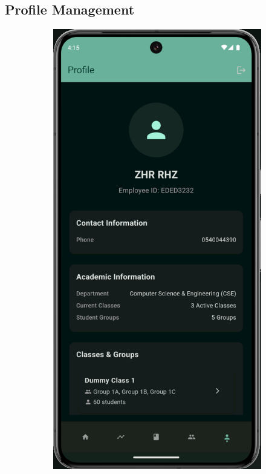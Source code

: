 \subsection{Profile Management}\nopagebreak[4]
\begin{figure}[H]
    \centering
    \begin{subfigure}[b]{0.35\textwidth}
        \includegraphics[width=\textwidth]{images/rachid/teacher-side-profile.png}

\end{subfigure}
\end{figure}
